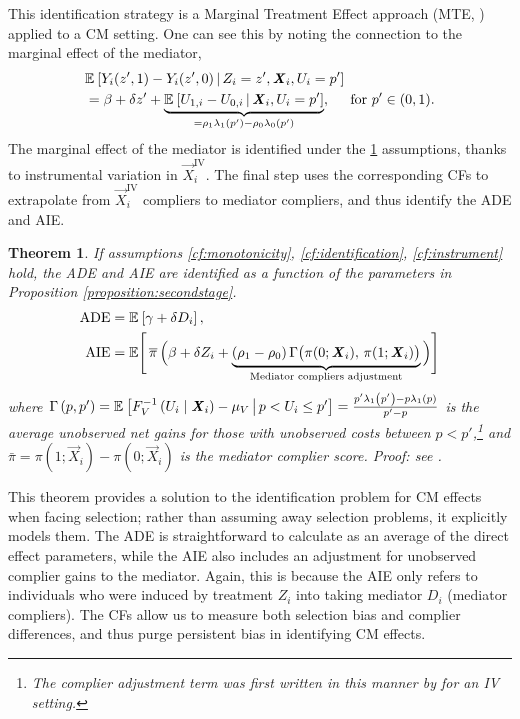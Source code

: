 This identification strategy is a Marginal Treatment Effect approach (MTE, \citealt{bjorklund1987estimation,heckman2005structural}) applied to a CM setting.
One can see this by noting the connection to the marginal effect of the mediator,
\begin{align*}
    & \mathbb{E}_{} \left[ Y_i(z', 1) - Y_i(z', 0) \, \middle\vert \, Z_i = z', \boldsymbol{\mathit{X}}_i, U_i = p' \right] \\
    &= \beta + \delta z' +
    \underbrace{\mathbb{E}_{} \left[ U_{1,i} - U_{0,i} \, \middle\vert \, \boldsymbol{\mathit{X}}_i, U_i = p' \right]}_{
        = \rho_1\lambda_1(p') - \rho_0\lambda_0(p')},
    \;\;\;\; \text{ for } p' \in (0,1).
\end{align*}
The marginal effect of the mediator is identified under the \ref{thm:cf-identification} assumptions, thanks to instrumental variation in $\vec X_i^{\text{IV}}$.
The final step uses the corresponding CFs to extrapolate from $\vec X_i^{\text{IV}}$ compliers to mediator compliers, and thus identify the ADE and AIE.

\newtheorem{theoremCF}{Theorem}
\renewcommand\thetheoremCF{CF}
\begin{theoremCF}
    \label{thm:cf-identification}
    If assumptions \ref{cf:monotonicity}, \ref{cf:identification}, \ref{cf:instrument} hold, the ADE and AIE are identified as a function of the parameters in Proposition \ref{proposition:secondstage}.
    \begin{align*}
    \text{ADE}
        &= \mathbb{E}_{} \left[ \gamma + \delta D_i \right], \\
    \text{AIE}
        &= \mathbb E \Bigg[ \, \overline{\pi} \,
            \Big( \beta +  \delta Z_i +
                \underbrace{ (\rho_1 - \rho_0) \,
                \Gamma \big(\pi(0; \boldsymbol{\mathit{X}}_i), \, \pi(1; \boldsymbol{\mathit{X}}_i) \big)}_{
                    \text{Mediator compliers adjustment}} \Big) \Bigg]
    \end{align*}
    where $\Gamma\left(p,p'\right) 
    = \mathbb{E}_{} \left[  F_V^{-1}\left( U_i \mid \boldsymbol{\mathit{X}}_i \right) - \mu_V \, \middle\vert \, p < U_i \leq p' \right]
    = \frac{p'\lambda_1\left(p'\right) - p\lambda_1\left(p\right)}{p' - p}$ is the average unobserved net gains for those with unobserved costs between $p < p'$,\footnote{
        The complier adjustment term was first written in this manner by \cite{kline2019heckits} for an IV setting.
    } and $\bar\pi = \pi(1; \vec X_i) - \pi(0; \vec X_i)$ is the mediator complier score.
    Proof: see .
\end{theoremCF}

This theorem provides a solution to the identification problem for CM effects when facing selection;
rather than assuming away selection problems, it explicitly models them.
The ADE is straightforward to calculate as an average of the direct effect parameters, while the AIE also includes an adjustment for unobserved complier gains to the mediator.
Again, this is because the AIE only refers to individuals who were induced by treatment $Z_i$ into taking mediator $D_i$ (mediator compliers).
The CFs allow us to measure both selection bias and complier differences, and thus purge persistent bias in identifying CM effects.

